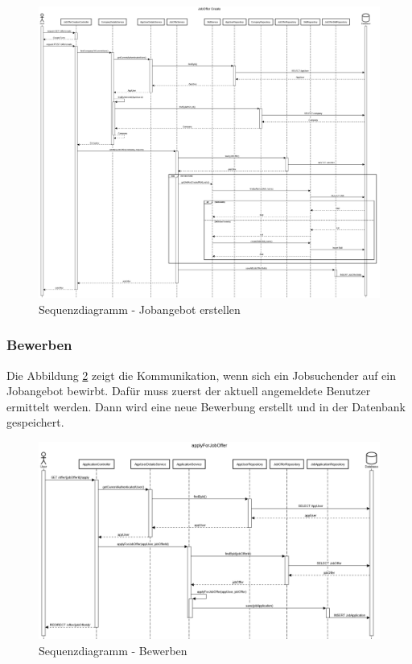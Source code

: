 \documentclass[12pt, letterpaper]{article}
\begin{document}
    \begin{figure}[h!]
        \includegraphics[width = \linewidth]{sequence/JobOfferCreateSequenzDiagramm.png}
        \caption{Sequenzdiagramm - Jobangebot erstellen}
        \label{fig:CreateJobOffer}
    \end{figure}

    \subsubsection{Bewerben}

    Die Abbildung \ref{fig:Apply} zeigt die Kommunikation, wenn sich ein Jobsuchender auf ein Jobangebot bewirbt. Dafür muss zuerst
    der aktuell angemeldete Benutzer ermittelt werden. Dann wird eine neue Bewerbung erstellt und in der Datenbank gespeichert.

    \begin{figure}[h!]
        \includegraphics[width = \linewidth]{sequence/applyForJobOfferSequenzDiagramm.png}
        \caption{Sequenzdiagramm - Bewerben}
        \label{fig:Apply}
    \end{figure}
\end{document}
